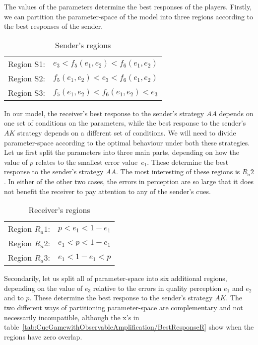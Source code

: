 \documentclass[a4paper,12pt]{article}
\numberwithin{equation}{section}
\begin{document}
The values of the parameters determine the best responses of the players. Firstly, we can partition the parameter-space of the model into three regions according to the best responses of the sender.

\begin{table}[h]
\begin{center}
\begin{tabular}{lc}
Region S1: & $e_{3}<f_{5}(e_{1},e_{2})<f_{6}(e_{1},e_{2})$\\
Region S2: & $f_{5}(e_{1},e_{2})<e_{3}<f_{6}(e_{1},e_{2})$\\
Region S3: & $f_{5}(e_{1},e_{2})<f_{6}(e_{1},e_{2})<e_{3}$
\end{tabular}
\end{center}
\caption{Sender's regions}
\label{tab:CueGamewithObservableAmplification/RegionsS}
\end{table}

In our model, the receiver's best response to the sender's strategy $AA$ depends on one set of conditions on the parameters, while the best response to the sender's $AK$ strategy depends on a different set of conditions. We will need to divide parameter-space according to the optimal behaviour under both these strategies. Let us first split the parameters into three main parts, depending on how the value of $p$ relates to the smallest error value~$e_{1}$. These determine the best response to the sender's strategy $AA$. The most interesting of these regions is $R_{a}2$. In either of the other two cases, the errors in perception are so large that it does not benefit the receiver to pay attention to any of the sender's cues.

\begin{table}[h]
\begin{center}
\begin{tabular}{lc}
Region $R_{a}1$: & $p<e_{1}<1-e_{1}$\\
Region $R_{a}2$: & $e_{1}<p<1-e_{1}$\\
Region $R_{a}3$: & $e_{1}<1-e_{1}<p$
\end{tabular}
\end{center}
\caption{Receiver's regions}
\label{tab:CueGamewithObservableAmplification/RegionsRa}
\end{table}

Secondarily, let us split all of parameter-space into six additional regions, depending on the value of $e_{3}$ relative to the errors in quality perception $e_{1}$ and $e_{2}$ and to $p$. These determine the best response to the sender's strategy $AK$. The two different ways of partitioning parameter-space are complementary and not necessarily incompatible, although the x's in table~\ref{tab:CueGamewithObservableAmplification/BestResponseR} show when the regions have zero overlap.
\end{document}
